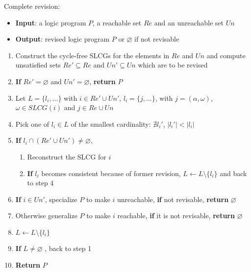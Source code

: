     \noindent
    \begin{minipage}{\linewidth}
    \vspace{1em}
    Complete revision:
    \begin{itemize}
        \item \textbf{Input}: a logic program $P$, a reachable set $Re$ and an unreachable set $Un$
        \item \textbf{Output}: revised logic program $P$ or $\varnothing$ if not revisable
    \end{itemize}
    \begin{enumerate}
        \item Construct the cycle-free SLCGs for the elements in $Re$ and $Un$ and compute unsatisfied sets $Re'\subseteq Re$ and $Un'\subseteq Un$ which are to be revised
        \item \textbf{If} $Re'=\varnothing$ and $Un'=\varnothing$, \textbf{return} $P$
        \item Let $L=\{l_i,\ldots\}$ with $i\in Re' \cup Un'$, $l_i=\{j,\ldots\}$, with $j=(\alpha,\omega)$, $\omega \in SLCG(i)$ and $ j\in Re\cup Un$ \label{step:dependency}
        \item Pick one of $l_i\in L$ of the smallest cardinality: $\nexists l_i'$, $|l_i'| < |l_i|$ \label{step:cardinality}
        \item \textbf{If} $l_i\cap (Re'\cup Un')\neq\varnothing$, \label{step:check}
        \begin{enumerate}
            \item Reconstruct the SLCG for $i$
            \item \textbf{If} $l_i$ becomes consistent because of former revision, $L\gets L\setminus \{l_i\}$ and back to step 4
        \end{enumerate}
        \item \textbf{If} $i\in Un'$, specialize $P$ to make $i$ unreachable, \textbf{if} not revisable, \textbf{return} $\varnothing$ \label{step:specialize}
        \item Otherwise generalize $P$ to make $i$ reachable, \textbf{if} it is not revisable, \textbf{return} $\varnothing$ \label{step:generalize}
        
        \item $L\gets L\setminus\{l_i\}$ \label{step:update}
        \item \textbf{If} $L\neq\varnothing$ , back to step 1 \label{step:recheck}
        \item \textbf{Return} $P$
    \end{enumerate} 
    \vspace{0.1em}
    \end{minipage}
    
